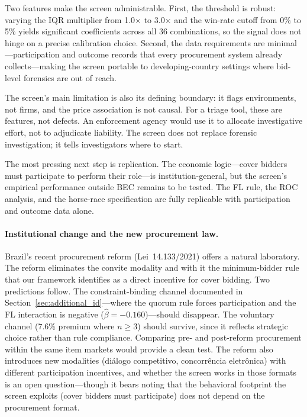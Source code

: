 Two features make the screen administrable. First, the threshold is
robust: varying the IQR multiplier from 1.0$\times$ to 3.0$\times$
and the win-rate cutoff from 0\% to 5\% yields significant
coefficients across all 36 combinations, so the signal does not
hinge on a precise calibration choice. Second, the data requirements
are minimal---participation and outcome records that every
procurement system already collects---making the screen portable to
developing-country settings where bid-level forensics are out of
reach.

The screen's main limitation is also its defining boundary: it flags
environments, not firms, and the price association is not causal.
For a triage tool, these are features, not defects. An enforcement
agency would use it to allocate investigative effort, not to
adjudicate liability. The screen does not replace forensic
investigation; it tells investigators where to start.

The most pressing next step is replication. The economic
logic---cover bidders must participate to perform their role---is
institution-general, but the screen's empirical performance outside
BEC remains to be tested. The FL rule, the ROC analysis, and the
horse-race specification are fully replicable with participation and
outcome data alone.

\paragraph{Institutional change and the new procurement law.}
Brazil's recent procurement reform (Lei~14.133/2021) offers a
natural laboratory. The reform eliminates the convite modality
and with it the minimum-bidder rule that our framework identifies as
a direct incentive for cover bidding. Two predictions follow.
The constraint-binding channel documented in
Section~\ref{sec:additional_id}---where the quorum rule forces
participation and the FL interaction is negative
($\hat{\beta} = -0.160$)---should disappear. The voluntary channel
(7.6\% premium where $n \geq 3$) should survive, since it reflects
strategic choice rather than rule compliance. Comparing pre- and
post-reform procurement within the same item markets would provide a
clean test. The reform also introduces new modalities (di\'alogo
competitivo, concorr\^encia eletr\^onica) with different
participation incentives, and whether the screen works in those
formats is an open question---though it bears noting that the
behavioral footprint the screen exploits (cover bidders must
participate) does not depend on the procurement format.

